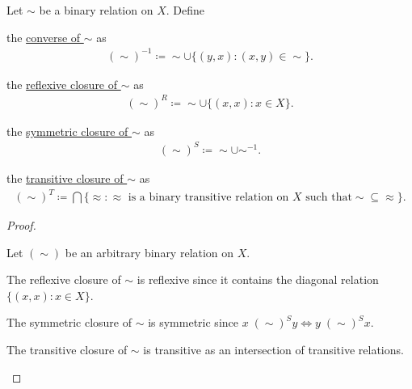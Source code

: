\begin{definition}\label{def:derived_relations}
  Let $\sim$ be a binary relation on $X$. Define
  \begin{defenum}
    \item\label{def:derived_relations/converse} the \ul{converse of $\sim$} as
    \begin{align*}
      (\sim)^{-1} \coloneqq \sim \cup \{ (y, x) \colon (x, y) \in \sim \}.
    \end{align*}

    \item\label{def:derived_relations/reflexive} the \ul{reflexive closure of $\sim$} as
    \begin{align*}
      (\sim)^R \coloneqq \sim \cup \{ (x, x) \colon x \in X \}.
    \end{align*}

    \item\label{def:derived_relations/symmetric} the \ul{symmetric closure of $\sim$} as
    \begin{align*}
      (\sim)^S \coloneqq \sim \cup \sim^{-1}.
    \end{align*}

    \item\label{def:derived_relations/transitive} the \ul{transitive closure of $\sim$} as
    \begin{align*}
      (\sim)^T \coloneqq \bigcap \{ \approx \colon \approx \text{ is a binary transitive relation on $X$ such that} \sim \subseteq \approx \}.
    \end{align*}
  \end{defenum}
\end{definition}
\begin{proof}
\begin{itemize}
  Let $(\sim)$ be an arbitrary binary relation on $X$.

  \begin{description}
     The reflexive closure of $\sim$ is reflexive since it contains the diagonal relation $\{ (x, x) \colon x \in X \}$.

     The symmetric closure of $\sim$ is symmetric since $x \;(\sim)^S y \iff y \;(\sim)^S x$.

     The transitive closure of $\sim$ is transitive as an intersection of transitive relations.
  \end{description}
\end{itemize}
\end{proof}
